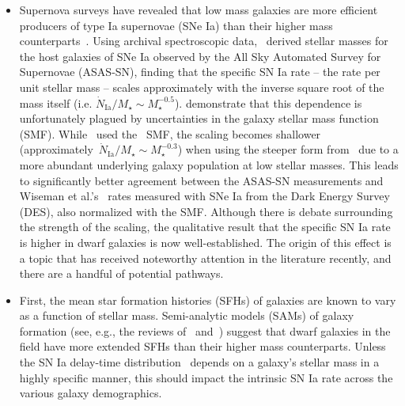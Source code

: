 \documentclass[ms.tex]{subfiles}
\begin{document}
\begin{itemize}
	\item Supernova surveys have revealed that low mass galaxies are
	more efficient producers of type Ia supernovae (SNe Ia) than their higher
	mass counterparts~\citep[e.g.][]{Mannucci2005}.
	Using archival spectroscopic data,~\citet{Brown2019} derived stellar
	masses for the host galaxies of SNe Ia observed by the All Sky
	Automated Survey for Supernovae (ASAS-SN), finding that the specific SN
	Ia rate -- the rate per unit stellar mass -- scales approximately with
	the inverse square root of the mass itself (i.e.
	$\dot{N}_\text{Ia} / M_\star \sim M_\star^{-0.5}$).
	\citet{Gandhi2022} demonstrate that this dependence is unfortunately
	plagued by uncertainties in the galaxy stellar mass function (SMF).
	While~\citet{Brown2019} used the~\citet{Bell2003} SMF, the scaling becomes
	shallower (approximately~$\dot{N}_\text{Ia} / M_\star \sim M_\star^{-0.3}$)
	when using the steeper form from~\citet{Baldry2012} due to a more abundant
	underlying galaxy population at low stellar masses.
	This leads to significantly better agreement between the ASAS-SN
	measurements and Wiseman et al.'s~\citeyearpar{Wiseman2021} rates measured
	with SNe Ia from the Dark Energy Survey (DES), also normalized with the
	\citet{Baldry2012} SMF.
	Although there is debate surrounding the strength of the scaling, the
	qualitative result that the specific SN Ia rate is higher in dwarf galaxies
	is now well-established.
	The origin of this effect is a topic that has received noteworthy attention
	in the literature recently, and there are a handful of potential pathways.

	\item First, the mean star formation histories (SFHs) of galaxies are known
	to vary as a function of stellar mass.
	Semi-analytic models (SAMs) of galaxy formation (see, e.g., the
	reviews of~\citealp{Baugh2006} and~\citealp*{Somerville2015a}) suggest that
	dwarf galaxies in the field have more extended SFHs than their higher mass
	counterparts.
	Unless the SN Ia delay-time distribution~\citep[DTD; e.g.][]{Maoz2012a}
	depends on a galaxy's stellar mass in a highly specific manner, this should
	impact the intrinsic SN Ia rate across the various galaxy demographics.


\end{itemize}
\end{document}
